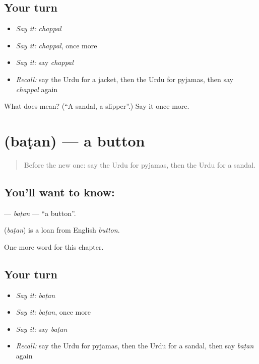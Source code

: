 \subsection*{Your turn}
\begin{itemize}
\raggedright
  \item \emph{Say it:} \emph{chappal}
  \item \emph{Say it:} \emph{chappal}, once more
  \item \emph{Say it:} say \emph{chappal}
  \item \emph{Recall:} say the Urdu for a jacket, then the Urdu for pyjamas, then say \emph{chappal} again
\end{itemize}

\begin{tcolorbox}[breakable,colback=teal!4,colframe=teal!35!black,title={Before you move on}]
What does  mean? (\textquotedblleft{}A sandal, a slipper\textquotedblright{}.) Say it once more.
\end{tcolorbox}
\section[\texorpdfstring{\ur{بٹن} (baṭan)}{بٹن (baṭan)}]{ (baṭan) — a button}

\label{lesson:UR-C122-batan}



\begin{quote}
Before the new one: say the Urdu for pyjamas, then the Urdu for a sandal.
\end{quote}

\subsection*{You'll want to know: }
\textbf{} — \emph{baṭan} — \textquotedblleft{}a button\textquotedblright{}.

\begin{cousinweb}
\textbf{} (\emph{baṭan}) is a loan from English \emph{button}.
\end{cousinweb}

\begin{grammarlens}[title={What you've built}]
One more word for this chapter.
\end{grammarlens}

\subsection*{Your turn}
\begin{itemize}
\raggedright
  \item \emph{Say it:} \emph{baṭan}
  \item \emph{Say it:} \emph{baṭan}, once more
  \item \emph{Say it:} say \emph{baṭan}
  \item \emph{Recall:} say the Urdu for pyjamas, then the Urdu for a sandal, then say \emph{baṭan} again
\end{itemize}

